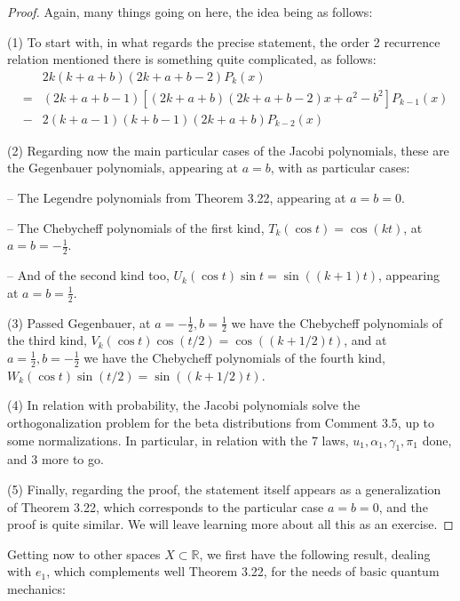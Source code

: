 \documentclass[12pt]{amsbook}
\begin{document}
\begin{proof}
Again, many things going on here, the idea being as follows:

\medskip

(1) To start with, in what regards the precise statement, the order 2 recurrence relation mentioned there is something quite complicated, as follows:
\begin{eqnarray*}
&&2k(k+a+b)(2k+a+b-2)P_k(x)\\
&=&(2k+a+b-1)\left[(2k+a+b)(2k+a+b-2)x+a^2-b^2\right]P_{k-1}(x)\\
&-&2(k+a-1)(k+b-1)(2k+a+b)P_{k-2}(x)
\end{eqnarray*}

(2) Regarding now the main particular cases of the Jacobi polynomials, these are the Gegenbauer polynomials, appearing at $a=b$, with as particular cases:

\medskip

-- The Legendre polynomials from Theorem 3.22, appearing at $a=b=0$.

\medskip

-- The Chebycheff polynomials of the first kind, $T_k(\cos t)=\cos(kt)$, at $a=b=-\frac{1}{2}$.

\medskip

-- And of the second kind too, $U_k(\cos t)\sin t=\sin((k+1)t)$, appearing at $a=b=\frac{1}{2}$.

\medskip

(3) Passed Gegenbauer, at $a=-\frac{1}{2},b=\frac{1}{2}$ we have the Chebycheff polynomials of the third kind, $V_k(\cos t)\cos(t/2)=\cos((k+1/2)t)$, and at $a=\frac{1}{2},b=-\frac{1}{2}$ we have the Chebycheff polynomials of the fourth kind, $W_k(\cos t)\sin(t/2)=\sin((k+1/2)t)$.

\medskip

(4) In relation with probability, the Jacobi polynomials solve the orthogonalization problem for the beta distributions from Comment 3.5, up to some normalizations. In particular, in relation with the 7 laws, $u_1,\alpha_1,\gamma_1,\pi_1$ done, and 3 more to go.

\medskip

(5) Finally, regarding the proof, the statement itself appears as a generalization of Theorem 3.22, which corresponds to the particular case $a=b=0$, and the proof is quite similar. We will leave learning more about all this as an exercise.
\end{proof}

Getting now to other spaces $X\subset\mathbb R$, we first have the following result, dealing with $e_1$, which complements well Theorem 3.22, for the needs of basic quantum mechanics:
\end{document}
